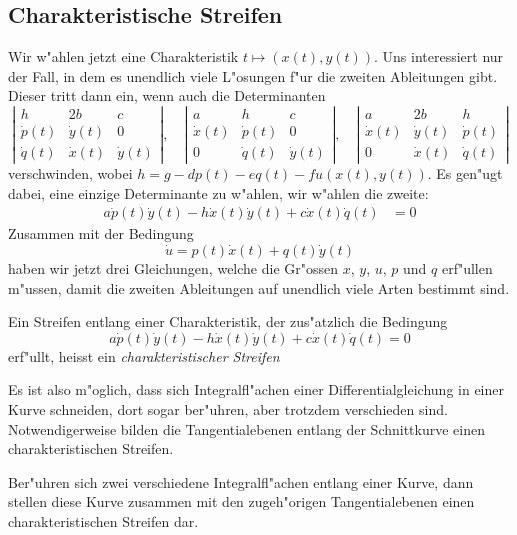 \subsection{Charakteristische Streifen}
Wir w"ahlen jetzt eine Charakteristik $t\mapsto(x(t),y(t))$.
Uns interessiert nur der Fall, in dem es unendlich viele
L"osungen f"ur die zweiten Ableitungen gibt. Dieser tritt dann
ein, wenn auch die Determinanten
\[
\left|
\begin{matrix}
h&2b&c\\
\dot p(t)&\dot y(t)&0\\
\dot q(t)&\dot x(t)&\dot y(t)
\end{matrix}
\right|
,
\quad
\left|
\begin{matrix}
a&h&c\\
\dot x(t)&\dot p(t)&0\\
0&\dot q(t)&\dot y(t)
\end{matrix}
\right|
,
\quad
\left|
\begin{matrix}
a&2b&h\\
\dot x(t)&\dot y(t)&\dot p(t)\\
0&\dot x(t)&\dot q(t)
\end{matrix}
\right|
\]
verschwinden, wobei $h=g-dp(t)-eq(t)-fu(x(t),y(t))$.
Es gen"ugt dabei, eine einzige Determinante zu w"ahlen,
wir w"ahlen die zweite:
\begin{align*}
a\dot p(t)\dot y(t)-h\dot x(t)\dot y(t)+c\dot x(t)\dot q(t)&=0
\end{align*}
Zusammen mit der Bedingung
\[
\dot u=p(t)\dot x(t)+q(t)\dot y(t)
\]
haben wir jetzt drei Gleichungen, welche die Gr"ossen 
$x$, $y$, $u$, $p$ und $q$ erf"ullen m"ussen, damit die zweiten
Ableitungen auf unendlich viele Arten bestimmt sind.

\begin{definition}
Ein Streifen entlang einer Charakteristik, der zus"atzlich die
Bedingung 
\[
a\dot p(t)\dot y(t)-h\dot x(t)\dot y(t)+c\dot x(t)\dot q(t)=0
\]
erf"ullt, heisst ein {\it charakteristischer Streifen}
\end{definition}

Es ist also m"oglich, dass sich Integralfl"achen einer Differentialgleichung
in einer Kurve schneiden, dort sogar ber"uhren, aber trotzdem verschieden
sind. Notwendigerweise bilden die Tangentialebenen
entlang der Schnittkurve einen charakteristischen Streifen.

\begin{satz}Ber"uhren sich zwei verschiedene Integralfl"achen entlang einer
Kurve, dann stellen diese Kurve zusammen mit den zugeh"origen Tangentialebenen
einen charakteristischen Streifen dar.
\end{satz}

